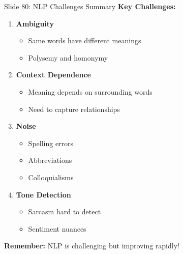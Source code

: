 \documentclass[8pt]{beamer}
\begin{document}
	\begin{frame}{Slide 80: NLP Challenges Summary}
		\fontsize{6.5}{7.5}\selectfont
		\textbf{Key Challenges:}
		\begin{enumerate}
			\item \textbf{Ambiguity}
			\begin{itemize}
				\item Same words have different meanings
				\item Polysemy and homonymy
			\end{itemize}
			\item \textbf{Context Dependence}
			\begin{itemize}
				\item Meaning depends on surrounding words
				\item Need to capture relationships
			\end{itemize}
			\item \textbf{Noise}
			\begin{itemize}
				\item Spelling errors
				\item Abbreviations
				\item Colloquialisms
			\end{itemize}
			\item \textbf{Tone Detection}
			\begin{itemize}
				\item Sarcasm hard to detect
				\item Sentiment nuances
			\end{itemize}
		\end{enumerate}
		
		\textcolor{myblue}{\textbf{Remember:}} NLP is challenging but improving rapidly!
	\end{frame}
	
	
\end{document}
